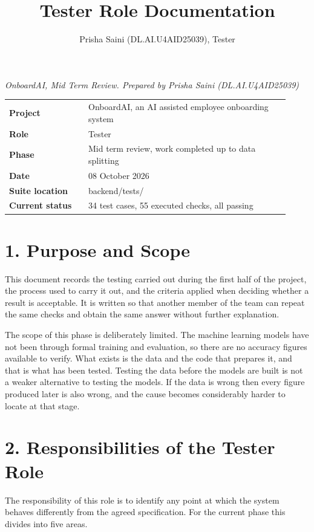 \documentclass[11pt,a4paper]{article}
\begin{document}
\title{\textbf{Tester Role Documentation}}
\author{Prisha Saini (DL.AI.U4AID25039), Tester}
\date{}
\maketitle

\begin{center}\itshape OnboardAI, Mid Term Review. Prepared by Prisha Saini (DL.AI.U4AID25039)\end{center}

\begin{tabular}{p{0.26\linewidth}p{0.66\linewidth}}
\toprule
\textbf{Project} & OnboardAI, an AI assisted employee onboarding system \\
\textbf{Role} & Tester \\
\textbf{Phase} & Mid term review, work completed up to data splitting \\
\textbf{Date} & 08 October 2026 \\
\textbf{Suite location} & backend/tests/ \\
\textbf{Current status} & 34 test cases, 55 executed checks, all passing \\
\bottomrule
\end{tabular}

\section{1. Purpose and Scope}
This document records the testing carried out during the first half of the project, the process used to carry it out, and the criteria applied when deciding whether a result is acceptable. It is written so that another member of the team can repeat the same checks and obtain the same answer without further explanation.

The scope of this phase is deliberately limited. The machine learning models have not been through formal training and evaluation, so there are no accuracy figures available to verify. What exists is the data and the code that prepares it, and that is what has been tested. Testing the data before the models are built is not a weaker alternative to testing the models. If the data is wrong then every figure produced later is also wrong, and the cause becomes considerably harder to locate at that stage.

\section{2. Responsibilities of the Tester Role}
The responsibility of this role is to identify any point at which the system behaves differently from the agreed specification. For the current phase this divides into five areas.
\end{document}
